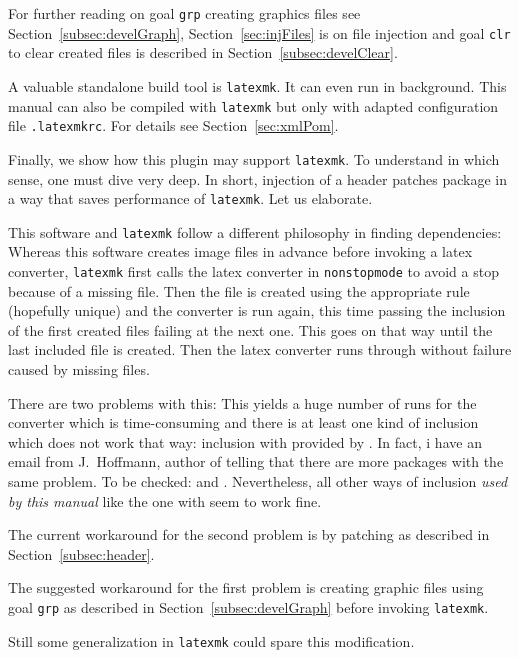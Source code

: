 For further reading on goal \texttt{grp} creating graphics files 
see Section~\ref{subsec:develGraph}, 
Section~\ref{sec:injFiles} is on file injection and 
goal \texttt{clr} to clear created files is 
described in Section~\ref{subsec:develClear}. 


A valuable standalone build tool is \texttt{latexmk}. 
It can even run in background. 
This manual can also be compiled with \texttt{latexmk} 
but only with adapted configuration file \texttt{.latexmkrc}. 
For details see Section~\ref{sec:xmlPom}. 
\medskip



Finally, we show how this plugin may support \texttt{latexmk}. 
To understand in which sense, one must dive very deep. 
In short, injection of a header patches package  
in a way that saves performance of \texttt{latexmk}. 
Let us elaborate. 

This software and \texttt{latexmk} follow a different philosophy in finding dependencies: 
Whereas this software creates image files in advance before invoking a latex converter, 
\texttt{latexmk} first calls the latex converter in \texttt{nonstopmode} 
to avoid a stop because of a missing file. 
Then the file is created using the appropriate rule (hopefully unique) 
and the converter is run again, 
this time passing the inclusion of the first created files 
failing at the next one. 
This goes on that way until the last included file is created. 
Then the latex converter runs through without failure caused by missing files. 

There are two problems with this: 
This yields a huge number of runs for the converter 
which is time-consuming 
and there is at least one kind of inclusion which does not work that way: 
inclusion with  
provided by . 
In fact, i have an email from J.~Hoffmann, author of  
telling that there are more packages with the same problem. 
To be checked:  and . 
Nevertheless, all other ways of inclusion \emph{used by this manual} 
like the one with  seem to work fine. 

The current workaround for the second problem 
is by patching  as described in Section~\ref{subsec:header}.

The suggested workaround for the first problem is 
creating graphic files using goal \texttt{grp} as described in Section~\ref{subsec:develGraph} 
before invoking \texttt{latexmk}. 

Still some generalization in \texttt{latexmk} could spare this modification. 

